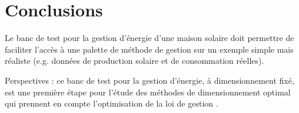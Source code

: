 \documentclass[a4paper,10pt,twocolumn]{article}
\begin{document}
\section{Conclusions}

Le banc de test pour la gestion d'énergie d'une maison solaire
doit permettre de faciliter l'accès à une palette de méthode de gestion
sur un exemple simple mais réaliste (e.g. données de production solaire et de consommation réelles).

Perspectives : ce banc de test pour la gestion d'énergie,
à dimensionnement fixé, est une première étape pour l'étude des méthodes
de dimensionnement optimal qui prennent en compte l'optimisation de la loi de gestion
\cite{Haessig:2014:SGE}.




\end{document}
